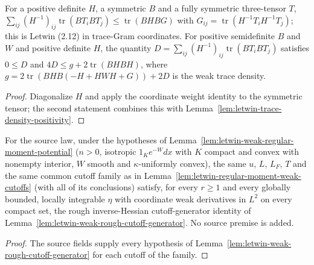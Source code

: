 \begin{lemma}
  \label{lem:letwin-trace-gram-comparison}
  \leanok
  For a positive definite $H$, a symmetric $B$ and a fully symmetric three-tensor $T$,
  $\sum_{ij}(H^{-1})_{ij}\operatorname{tr}(BT_iBT_j)\le\operatorname{tr}(BHBG)$ with $G_{ij}=\operatorname{tr}(H^{-1}T_iH^{-1}T_j)$; this is
  Letwin (2.12) in trace-Gram coordinates. For positive semidefinite $B$ and $W$ and positive definite $H$, the quantity
  $D=\sum_{ij}(H^{-1})_{ij}\operatorname{tr}(BT_iBT_j)$ satisfies $0\le D$ and $4D\le g+2\operatorname{tr}(BHBH)$, where
  $g=2\operatorname{tr}(BHB(-H+HWH+G))+2D$ is the weak trace density.
\end{lemma}
\begin{proof}
  \leanok
  Diagonalize $H$ and apply the coordinate weight identity to the symmetric tensor; the second statement combines this with
  Lemma~\ref{lem:letwin-trace-density-positivity}.
\end{proof}

\begin{lemma}
  \label{lem:letwin-regular-moment-bounded-weak-cutoff-testing}
  \leanok
  For the source law, under the hypotheses of Lemma~\ref{lem:letwin-weak-regular-moment-potential} ($n>0$, isotropic $1_Ke^{-W}dx$ with $K$ compact and convex with
  nonempty interior, $W$ smooth and $\kappa$-uniformly convex), the same $u$, $L$, $L_F$, $T$ and the same common cutoff family as in
  Lemma~\ref{lem:letwin-regular-moment-weak-cutoffs} (with all of its conclusions) satisfy, for every $r\ge1$ and every globally bounded,
  locally integrable $\eta$ with coordinate weak derivatives in $L^2$ on every compact set, the rough inverse-Hessian cutoff-generator
  identity of Lemma~\ref{lem:letwin-weak-rough-cutoff-generator}. No source premise is added.
\end{lemma}
\begin{proof}
  \leanok
  The source fields supply every hypothesis of Lemma~\ref{lem:letwin-weak-rough-cutoff-generator} for each cutoff of the family.
\end{proof}

